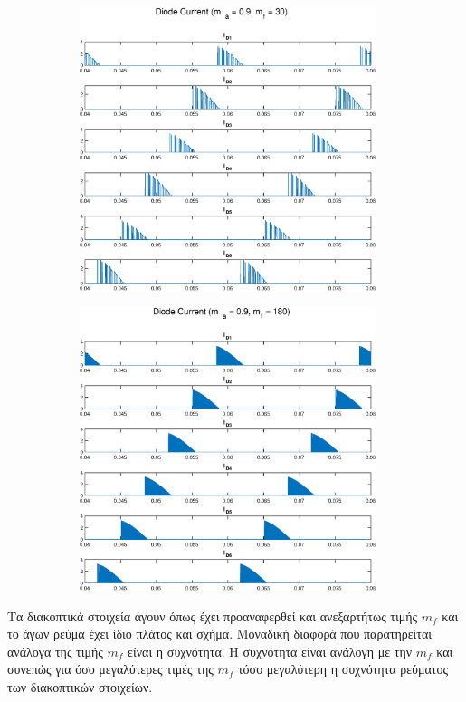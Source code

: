 \begin{figure}[h!]
	\begin{subfigure}{0.49\textwidth}
		\centering
		\includegraphics[width=0.95\textwidth]{Images/4_I_D_30.eps}
	\end{subfigure}
	\begin{subfigure}{0.49\textwidth}
		\centering
		\includegraphics[width=0.95\textwidth]{Images/4_I_D_180.eps}
	\end{subfigure}
\end{figure}
\noindent
Τα διακοπτικά στοιχεία άγουν όπως έχει προαναφερθεί και ανεξαρτήτως τιμής $m_f$ και το άγων ρεύμα έχει ίδιο πλάτος και σχήμα. Μοναδική διαφορά που παρατηρείται ανάλογα της τιμής $m_f$ είναι η συχνότητα. Η συχνότητα είναι ανάλογη με την $m_f$ και συνεπώς για όσο μεγαλύτερες τιμές της $m_f$ τόσο μεγαλύτερη η συχνότητα ρεύματος των διακοπτικών στοιχείων.

